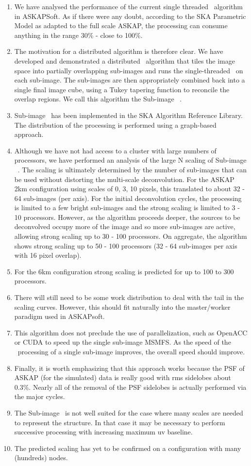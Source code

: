 \documentclass[11pt,a4paper,variablewidth]{article}
\begin{document}
\begin{enumerate}
	\item We have analysed the performance of the current single threaded \MAM\ algorithm in ASKAPSoft. As if there were any doubt, according to the SKA Parametric Model as adapted to the full scale ASKAP, the processing can consume anything in the range 30\% - close to 100\%.
	\item The motivation for a distributed algorithm is therefore clear. We have developed and demonstrated a distributed \MAM\ algorithm that tiles the image space into partially overlapping sub-images and runs the single-threaded \MAM\ on each sub-image. The sub-images are then appropriately combined back into a single final image cube, using a Tukey tapering function to reconcile the overlap regions. We call this algorithm the Sub-image \MAM\ .
	\item Sub-image \MAM\ has been implemented in the SKA Algorithm Reference Library. The distribution of the processing is performed using a graph-based approach.
	\item Although we have not had access to a cluster with large numbers of processors, we have performed an analysis of the large N scaling of Sub-image \MAM\ . The scaling is ultimately determined by the number of sub-images that can be used without distorting the multi-scale deconvolution. For the ASKAP 2km configuration using scales of 0, 3, 10 pixels, this translated to about 32 - 64 sub-images (per axis). For the initial deconvolution cycles, the processing is limited to a few bright sub-images and the strong scaling is limited to 3 - 10 processors. However, as the algorithm proceeds deeper, the sources to be deconvolved occupy more of the image and so more sub-images are active, allowing strong scaling up to 30 - 100 processors. On aggregate, the algorithm shows strong scaling up to 50 - 100 processors (32 - 64 sub-images per axis with 16 pixel overlap).
	\item For the 6km configuration strong scaling is predicted for up to 100 to 300 processors.
	\item There will still need to be some work distribution to deal with the tail in the scaling curves. However, this should fit naturally into the master/worker paradigm used in ASKAPsoft.
	\item This algorithm does not preclude the use of parallelization, such as OpenACC or CUDA to speed up the single sub-image MSMFS. As the speed of the \MAM\ processing of a single sub-image improves, the overall speed should improve.
	\item Finally, it is worth emphasizing that this approach works because the PSF of ASKAP (for the simulated) data is really good with rms sidelobes about 0.3\%. Nearly all of the removal of the PSF sidelobes is actually performed via the major cycles.
	\item The Sub-image \MAM\ is not well suited for the case where many scales are needed to represent the structure. In that case it may be necessary to perform successive processing with increasing maximum uv baseline.
	\item The predicted scaling has yet to be confirmed on a configuration with many (hundreds) nodes.
\end{enumerate}
\end{document}
